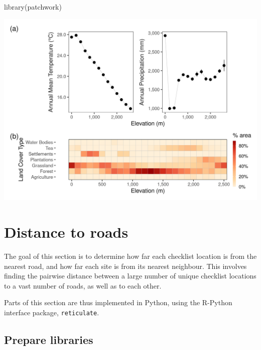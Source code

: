 \documentclass[]{article}
\newenvironment{Shaded}{}{}
\newcommand{\KeywordTok}[1]{\textcolor[rgb]{0.00,0.00,1.00}{#1}}
\newcommand{\NormalTok}[1]{#1}
\begin{document}
\begin{Shaded}
\begin{Highlighting}[]
\KeywordTok{library}\NormalTok{(patchwork)}
\end{Highlighting}
\end{Shaded}

\includegraphics{figs/fig_02_clim_lc_elev.png}

\hypertarget{distance-to-roads}{%
\section{Distance to roads}\label{distance-to-roads}}

The goal of this section is to determine how far each checklist location is from the nearest road, and how far each site is from its nearest neighbour. This involves finding the pairwise distance between a large number of unique checklist locations to a vast number of roads, as well as to each other.

Parts of this section are thus implemented in Python, using the R-Python interface package, \texttt{reticulate}.

\hypertarget{prepare-libraries-1}{%
\subsection{Prepare libraries}\label{prepare-libraries-1}}
\end{document}
